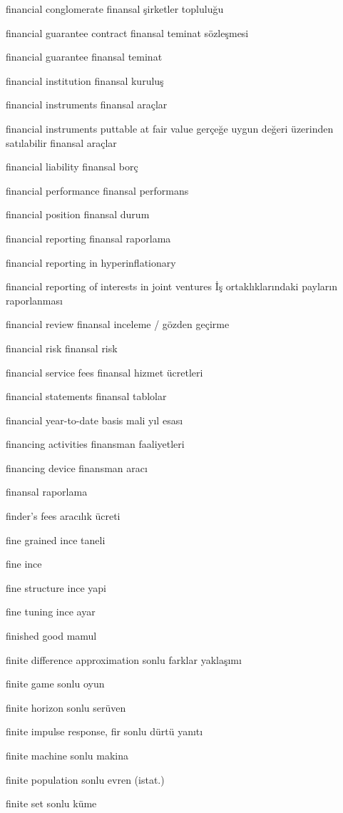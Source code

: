 \documentclass[12pt,fleqn]{article}\usepackage{../../common}
\begin{document}
financial conglomerate finansal şirketler topluluğu

financial guarantee contract finansal teminat sözleşmesi

financial guarantee finansal teminat

financial institution finansal kuruluş

financial instruments finansal araçlar

financial instruments puttable at fair value gerçeğe uygun değeri üzerinden satılabilir finansal araçlar

financial liability finansal borç

financial performance finansal performans

financial position finansal durum

financial reporting finansal raporlama

financial reporting in hyperinflationary

financial reporting of interests in joint ventures İş ortaklıklarındaki payların raporlanması

financial review finansal inceleme / gözden geçirme

financial risk finansal risk

financial service fees finansal hizmet ücretleri

financial statements finansal tablolar

financial year-to-date basis mali yıl esası

financing activities finansman faaliyetleri

financing device finansman aracı

finansal raporlama

finder's fees aracılık ücreti

fine grained ince taneli

fine ince

fine structure ince yapi

fine tuning ince ayar

finished good mamul

finite difference approximation sonlu farklar yaklaşımı

finite game sonlu oyun

finite horizon sonlu serüven

finite impulse response, fir sonlu dürtü yanıtı

finite machine sonlu makina

finite population sonlu evren (istat.)

finite set sonlu küme
\end{document}
